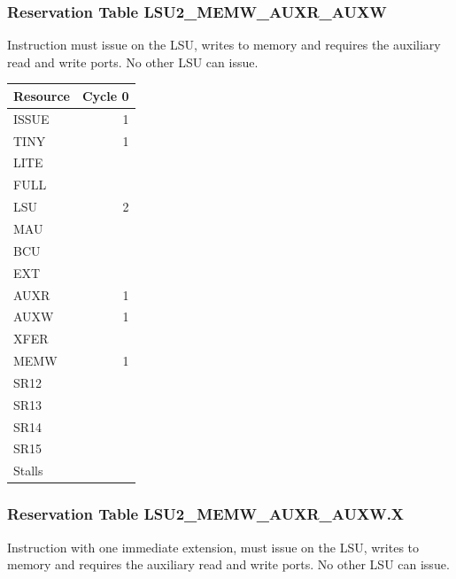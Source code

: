 \subsubsection{Reservation Table LSU2\_MEMW\_AUXR\_AUXW} \label{sec:reservation-LSU2-MEMW-AUXR-AUXW}

Instruction must issue on the LSU, writes to memory and requires the auxiliary read and write ports. No other LSU can issue.
\medskip

\begin{tabular}{|l|r|} \hline
Resource	& Cycle 0 \\ \hline
\textsf{ISSUE}	& 1	\\
\textsf{TINY}	& 1	\\
\textsf{LITE}	& 	\\
\textsf{FULL}	& 	\\
\textsf{LSU}	& 2	\\
\textsf{MAU}	& 	\\
\textsf{BCU}	& 	\\
\textsf{EXT}	& 	\\
\textsf{AUXR}	& 1	\\
\textsf{AUXW}	& 1	\\
\textsf{XFER}	& 	\\
\textsf{MEMW}	& 1	\\
\textsf{SR12}	& 	\\
\textsf{SR13}	& 	\\
\textsf{SR14}	& 	\\
\textsf{SR15}	& 	\\
\hline Stalls	& 	\\
\hline \end{tabular}

\subsubsection{Reservation Table LSU2\_MEMW\_AUXR\_AUXW.X} \label{sec:reservation-LSU2-MEMW-AUXR-AUXW.X}

Instruction with one immediate extension, must issue on the LSU, writes to memory and requires the auxiliary read and write ports. No other LSU can issue.
\medskip

